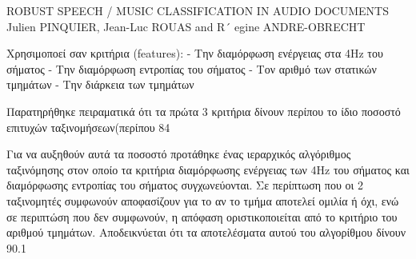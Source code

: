ROBUST SPEECH / MUSIC CLASSIFICATION IN AUDIO DOCUMENTS
Julien PINQUIER, Jean-Luc ROUAS and R´ egine ANDRE-OBRECHT


Χρησιμοποεί σαν κριτήρια (features):
- Την διαμόρφωση ενέργειας στα 4Hz του σήματος
- Την διαμόρφωση εντροπίας του σήματος
- Τον αριθμό των στατικών τμημάτων
- Την διάρκεια των τμημάτων 

Παρατηρήθηκε πειραματικά ότι τα πρώτα 3 κριτήρια δίνουν περίπου το ίδιο ποσοστό επιτυχών ταξινομήσεων(περίπου 84%

Για να αυξηθούν αυτά τα ποσοστό προτάθηκε ένας ιεραρχικός αλγόριθμος ταξινόμησης στον οποίο τα κριτήρια διαμόρφωσης ενέργειας των 4Ηz του σήματος και διαμόρφωσης εντροπίας του σήματος συγχωνεύονται. Σε περίπτωση που οι 2 ταξινομητές συμφωνούν αποφασίζουν για το αν το τμήμα αποτελεί ομιλία ή όχι, ενώ σε περιπτώση που δεν συμφωνούν, η απόφαση οριστικοποιείται από το κριτήριο του αριθμού τμημάτων. Αποδεικνύεται ότι τα αποτελέσματα αυτού του αλγορίθμου δίνουν 90.1%
